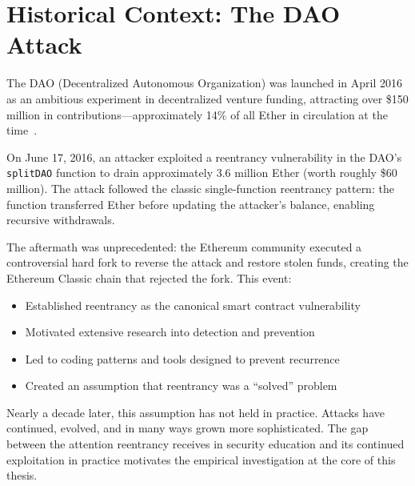 \section{Historical Context: The DAO Attack}
\label{sec:bg-dao}

The DAO (Decentralized Autonomous Organization) was launched in April 2016 as an ambitious experiment in decentralized venture funding, attracting over \$150 million in contributions---approximately 14\% of all Ether in circulation at the time~\cite{the-dao-analysis}.

On June 17, 2016, an attacker exploited a reentrancy vulnerability in the DAO's \lstinline{splitDAO} function to drain approximately 3.6 million Ether (worth roughly \$60 million). The attack followed the classic single-function reentrancy pattern: the function transferred Ether before updating the attacker's balance, enabling recursive withdrawals.

The aftermath was unprecedented: the Ethereum community executed a controversial hard fork to reverse the attack and restore stolen funds, creating the Ethereum Classic chain that rejected the fork. This event:
\begin{itemize}
    \item Established reentrancy as the canonical smart contract vulnerability
    \item Motivated extensive research into detection and prevention
    \item Led to coding patterns and tools designed to prevent recurrence
    \item Created an assumption that reentrancy was a ``solved'' problem
\end{itemize}

Nearly a decade later, this assumption has not held in practice. Attacks have continued, evolved, and in many ways grown more sophisticated. The gap between the attention reentrancy receives in security education and its continued exploitation in practice motivates the empirical investigation at the core of this thesis.

